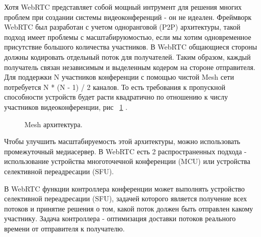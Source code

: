
Хотя WebRTC представляет собой мощный интрумент для решения многих проблем при создании системы видеоконференций - он не идеален. Фреймворк WebRTC был разработан с учетом одноранговой (P2P) архитектуры, такой подход имеет проблемы с масштабируюмостью, если мы хотим одновременное присутствие большого количества участников. В WebRTC общающиеся стороны должны кодировать отдельный поток для получателей. Таким образом, каждый получатель связан независимым и выделенным кодером на стороне отправителя. Для поддержки N участников конференции с помощью чистой Mesh сети потребуется N * (N - 1) / 2 каналов. То есть требования к пропускной способности устройств будет расти квадратично по отношению к числу участников видеоконференции, рис ~\ref{mesh} \cite{v17}.

\begin{figure}[ht]
\begin{center}

\caption{
\label{mesh}
     Mesh архитектура.}
\end {center}
\end {figure}

Чтобы улучшить масштабируемость этой архитектуры, можно использовать промежуточный медиасервер. В WebRTC есть 2 распространенных подхода - использование устройства многоточечной конференции (MCU) или устройства селективной переадресации (SFU).


В WebRTC функции контроллера конференции может выполнять устройство селективной переадресации (SFU), задачей которого является получение всех потоков и принятие решения о том, какой поток должен быть отправлен какому участнику. Задача контроллера - оптимизация доставки потоков реального времени от отправителя к получателю.

